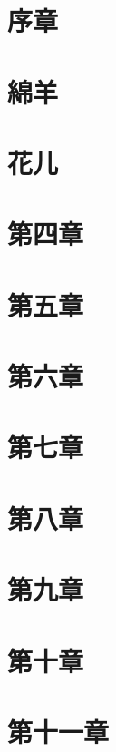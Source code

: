 \documentclass[12pt,a4paper,oneside,openany]{book}
\begin{document}
\tableofcontents

\chapter{序章}


\chapter{綿羊}


\chapter{花儿}


\chapter{第四章}


\chapter{第五章}


\chapter{第六章}


\chapter{第七章}


\chapter{第八章}


\chapter{第九章}


\chapter{第十章}


\chapter{第十一章}

\end{document}
